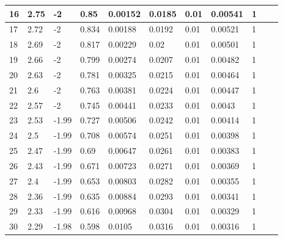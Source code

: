 \begin{table}[ht]
\begin{tabular}{|l|l|l|l|l|l|l|l|l|l|l|}
			16 & 2.75      & -2                    & 0.85    & 0.00152  & 0.0185 & 0.01  & 0.00541 & 1  \\ \hline
			17 & 2.72      & -2                    & 0.834   & 0.00188  & 0.0192 & 0.01  & 0.00521 & 1  \\ \hline
			18 & 2.69      & -2                    & 0.817   & 0.00229  & 0.02   & 0.01  & 0.00501 & 1  \\ \hline
			19 & 2.66      & -2                    & 0.799   & 0.00274  & 0.0207 & 0.01  & 0.00482 & 1  \\ \hline
			20 & 2.63      & -2                    & 0.781   & 0.00325  & 0.0215 & 0.01  & 0.00464 & 1  \\ \hline
			21 & 2.6       & -2                    & 0.763   & 0.00381  & 0.0224 & 0.01  & 0.00447 & 1  \\ \hline
			22 & 2.57      & -2                    & 0.745   & 0.00441  & 0.0233 & 0.01  & 0.0043  & 1  \\ \hline
			23 & 2.53      & -1.99                 & 0.727   & 0.00506  & 0.0242 & 0.01  & 0.00414 & 1  \\ \hline
			24 & 2.5       & -1.99                 & 0.708   & 0.00574  & 0.0251 & 0.01  & 0.00398 & 1  \\ \hline
			25 & 2.47      & -1.99                 & 0.69    & 0.00647  & 0.0261 & 0.01  & 0.00383 & 1  \\ \hline
			26 & 2.43      & -1.99                 & 0.671   & 0.00723  & 0.0271 & 0.01  & 0.00369 & 1  \\ \hline
			27 & 2.4       & -1.99                 & 0.653   & 0.00803  & 0.0282 & 0.01  & 0.00355 & 1  \\ \hline
			28 & 2.36      & -1.99                 & 0.635   & 0.00884  & 0.0293 & 0.01  & 0.00341 & 1  \\ \hline
			29 & 2.33      & -1.99                 & 0.616   & 0.00968  & 0.0304 & 0.01  & 0.00329 & 1  \\ \hline
			30 & 2.29      & -1.98                 & 0.598   & 0.0105   & 0.0316 & 0.01  & 0.00316 & 1  \\ \hline
		\end{tabular}
	\end{table}